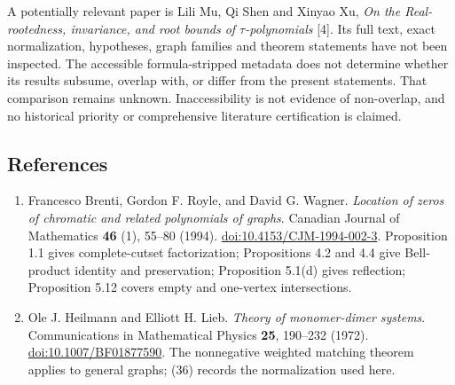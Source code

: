 \documentclass[
  11pt,
  a4paper,
]{article}
\begin{document}
A potentially relevant paper is Lili Mu, Qi Shen and Xinyao Xu, \emph{On
the Real-rootedness, invariance, and root bounds of
\(\tau\)-polynomials} {[}4{]}. Its full text, exact normalization,
hypotheses, graph families and theorem statements have not been
inspected. The accessible formula-stripped metadata does not determine
whether its results subsume, overlap with, or differ from the present
statements. That comparison remains unknown. Inaccessibility is not
evidence of non-overlap, and no historical priority or comprehensive
literature certification is claimed.

\subsection{References}\label{references}

\begin{enumerate}
\def\labelenumi{\arabic{enumi}.}
\item
  Francesco Brenti, Gordon F. Royle, and David G. Wagner. \emph{Location
  of zeros of chromatic and related polynomials of graphs}. Canadian
  Journal of Mathematics \textbf{46} (1), 55--80 (1994).
  \href{https://doi.org/10.4153/CJM-1994-002-3}{doi:10.4153/CJM-1994-002-3}.
  Proposition 1.1 gives complete-cutset factorization; Propositions 4.2
  and 4.4 give Bell-product identity and preservation; Proposition
  5.1(d) gives reflection; Proposition 5.12 covers empty and one-vertex
  intersections.
\item
  \begin{samepage}
  Ole J. Heilmann and Elliott H. Lieb. \emph{Theory of monomer-dimer
  systems}. Communications in Mathematical Physics \textbf{25}, 190--232
  (1972).
  \href{https://doi.org/10.1007/BF01877590}{doi:10.1007/BF01877590}. The
  nonnegative weighted matching theorem applies to general graphs; (36)
  records the normalization used here.


\end{samepage}
\end{enumerate}
\end{document}
